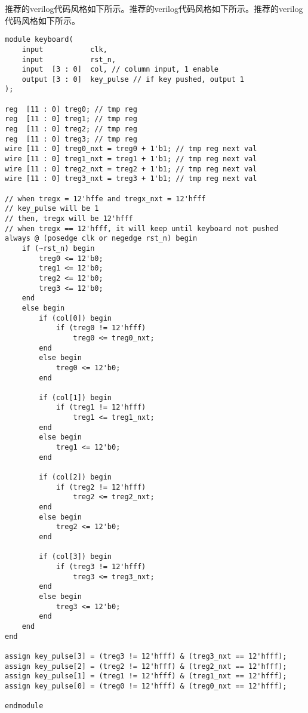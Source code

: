 
推荐的verilog代码风格如下所示。推荐的verilog代码风格如下所示。推荐的verilog代码风格如下所示。
\lstset{language=verilog}
\begin{lstlisting}
module keyboard(
    input           clk,
    input           rst_n,
    input  [3 : 0]  col, // column input, 1 enable
    output [3 : 0]  key_pulse // if key pushed, output 1
);

reg  [11 : 0] treg0; // tmp reg
reg  [11 : 0] treg1; // tmp reg
reg  [11 : 0] treg2; // tmp reg
reg  [11 : 0] treg3; // tmp reg
wire [11 : 0] treg0_nxt = treg0 + 1'b1; // tmp reg next val
wire [11 : 0] treg1_nxt = treg1 + 1'b1; // tmp reg next val
wire [11 : 0] treg2_nxt = treg2 + 1'b1; // tmp reg next val
wire [11 : 0] treg3_nxt = treg3 + 1'b1; // tmp reg next val

// when tregx = 12'hffe and tregx_nxt = 12'hfff
// key_pulse will be 1
// then, tregx will be 12'hfff
// when tregx == 12'hfff, it will keep until keyboard not pushed
always @ (posedge clk or negedge rst_n) begin
    if (~rst_n) begin
        treg0 <= 12'b0;
        treg1 <= 12'b0;
        treg2 <= 12'b0;
        treg3 <= 12'b0;
    end
    else begin
        if (col[0]) begin 
            if (treg0 != 12'hfff) 
                treg0 <= treg0_nxt;
        end
        else begin
            treg0 <= 12'b0;
        end

        if (col[1]) begin
            if (treg1 != 12'hfff) 
                treg1 <= treg1_nxt;
        end
        else begin   
            treg1 <= 12'b0;
        end

        if (col[2]) begin
            if (treg2 != 12'hfff)
                treg2 <= treg2_nxt;
        end
        else begin
            treg2 <= 12'b0;
        end

        if (col[3]) begin
            if (treg3 != 12'hfff) 
                treg3 <= treg3_nxt;
        end
        else begin        
            treg3 <= 12'b0;
        end
    end
end

assign key_pulse[3] = (treg3 != 12'hfff) & (treg3_nxt == 12'hfff); 
assign key_pulse[2] = (treg2 != 12'hfff) & (treg2_nxt == 12'hfff);
assign key_pulse[1] = (treg1 != 12'hfff) & (treg1_nxt == 12'hfff);
assign key_pulse[0] = (treg0 != 12'hfff) & (treg0_nxt == 12'hfff);

endmodule
\end{lstlisting}